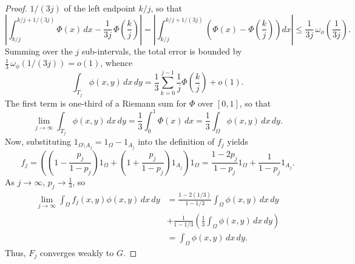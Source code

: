 \documentclass[10pt,a4paper]{amsart}
\begin{document}
\begin{proof}
$1/(3j)$ of the left endpoint $k/j$, so that
\begin{equation*}
    \left| \int_{k/j}^{k/j + 1/(3j)} \Phi(x)\,dx - \frac{1}{3j}\,\Phi\!\left(\frac{k}{j}\right) \right|
    = \left| \int_{k/j}^{k/j + 1/(3j)} \left( \Phi(x) - \Phi\!\left(\frac{k}{j}\right) \right) dx \right|
    \leq \frac{1}{3j}\,\omega_\phi\!\left(\frac{1}{3j}\right).
\end{equation*}
Summing over the $j$ sub-intervals, the total error is bounded by
$\frac{1}{3}\,\omega_\phi(1/(3j)) = o(1)$, whence
\begin{equation*}
    \int_{T_j} \phi(x,y) \, dx \, dy = \frac{1}{3} \sum_{k=0}^{j-1}\frac{1}{j}  \Phi\left(\frac{k}{j}\right) + o(1).
\end{equation*}
The first term is one-third of a Riemann sum for $\Phi$ over $[0,1]$, so that
\begin{equation*}
    \lim_{j \to \infty} \int_{T_j} \phi(x,y) \, dx \, dy = \frac{1}{3} \int_0^1 \Phi(x) \, dx = \frac{1}{3} \int_\Omega \phi(x,y) \, dx \, dy.
\end{equation*}
Now, substituting $1_{\Omega \setminus A_j} = 1_\Omega - 1_{A_j}$ into the definition of $f_j$
yields
\begin{equation*}
    f_j = \left( \left( 1 - \frac{p_j}{1-p_j} \right) 1_\Omega + \left( 1 + \frac{p_j}{1-p_j} \right) 1_{A_j} \right) 1_\Omega = \frac{1-2p_j}{1-p_j} 1_\Omega + \frac{1}{1-p_j} 1_{A_j}.
\end{equation*}
As $j \to \infty$, $p_j \to \frac{1}{3}$, so
\begin{align*}
    \lim_{j \to \infty} \int_\Omega f_j(x,y) \phi(x,y) \, dx \, dy &= \frac{1 - 2(1/3)}{1 - 1/3} \int_\Omega \phi(x,y) \, dx \, dy \\
    &+ \frac{1}{1 - 1/3} \left( \frac{1}{3} \int_\Omega \phi(x,y) \, dx \, dy \right) \\
    & = \int_\Omega \phi(x,y) \, dx \, dy.
\end{align*}
Thus, $F_j$ converges weakly to $G$.
\end{proof}
\end{document}
